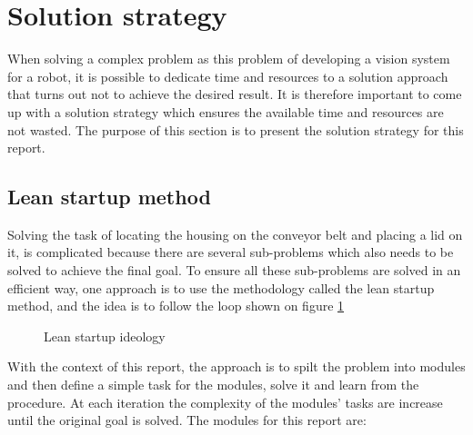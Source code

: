 \section{Solution strategy}
When solving a complex problem as this problem of developing a vision system for a robot, it is possible to dedicate time and resources to a solution approach that turns out not to achieve the desired result. It is therefore important to come up with a solution strategy which ensures the available time and resources are not wasted. The purpose of this section is to present the solution strategy for this report.

\subsection{Lean startup method}\label{sub_lean_startup}
Solving the task of locating the housing on the conveyor belt and placing a lid on it, is complicated because there are several sub-problems which also needs to be solved to achieve the final goal. To ensure all these sub-problems are solved in an efficient way, one approach is to use the methodology called the lean startup method, and the idea is to follow the loop shown on figure \ref{fig_lean_startup}
\begin{figure}[htbp!]
\centering
{}
  \caption{Lean startup ideology}
\label{fig_lean_startup}
\end{figure}\newline
With the context of this report, the approach is to spilt the problem into modules and then define a simple task for the modules, solve it and learn from the procedure. At each iteration the complexity of the modules' tasks are increase until the original goal is solved. The modules for this report are:
